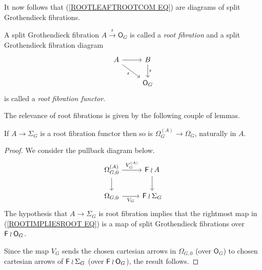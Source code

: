 \documentclass[a4paper,10pt]{article}%
\begin{document}
It now follows that (\ref{ROOTLEAFTROOTCOM EQ}) are diagrams of split Grothendieck fibrations.

\begin{definition}
A split Grothendieck fibration 
$A \xrightarrow{\mathsf{r}} \mathsf{O}_G$
is called a \textit{root fibration} and a split Grothendieck fibration diagram
\[
\begin{tikzcd}
	A \ar{r} \ar{rd}[swap]{\mathsf{r}}&
	B \ar{d}{\mathsf{r}} 
\\
	& \mathsf{O}_G 
\end{tikzcd}
\]
is called a \textit{root fibration functor}.
\end{definition}


The relevance of root fibrations is given by the following couple of lemmas.

\begin{lemma}\label{ROOTFIBPULL LEM}
If $A \to \Sigma_G$ is a root fibration functor then so is 
$\Omega_G^{(A)} \to \Omega_G$, naturally in $A$.
\end{lemma}


\begin{proof}
We consider the pullback diagram below.
\begin{equation}\label{ROOTIMPLIESROOT EQ}
\begin{tikzcd}
	\Omega_{G,0}^{(A)} \ar{r}{V_G^{(A)}} \ar{d} &
	\Fin \wr A \ar{d}
\\
	\Omega_{G,0} \ar{r}[swap]{V_G} &
	\Fin \wr \Sigma_G
\end{tikzcd}
\end{equation}
The hypothesis that $A \to \Sigma_G$ is root fibration 
implies that the rightmost map in (\ref{ROOTIMPLIESROOT EQ})
is a map of split Grothendieck fibrations over
$\mathsf{F} \wr \mathsf{O}_G$.

Since the map $V_G$ sends the chosen cartesian arrows in $\Omega_{G,0}$
(over $\mathsf{O}_G$) to chosen cartesian arrows of $\mathsf{F} \wr \Sigma_G$ (over $\mathsf{F} \wr \mathsf{O}_G$), the result follows.
\end{proof}
\end{document}
